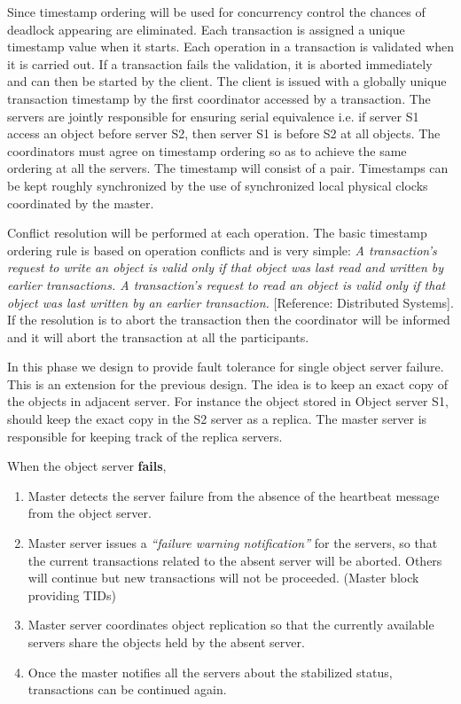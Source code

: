 \documentclass[times, 10pt,twocolumn]{article}
\begin{document}
\label{subsec:dldetect}
Since timestamp ordering will be used for concurrency control the chances of deadlock appearing are eliminated.
Each transaction is assigned a unique timestamp value when it starts. Each operation in a transaction is validated when it is carried out.
If a transaction fails the validation, it is aborted immediately and can then be started by the client. The client is issued with a globally unique transaction timestamp by the first coordinator accessed
by a transaction. The servers are jointly responsible for ensuring serial equivalence i.e. if server S1 access an object before server S2, then server S1 is before S2 at all objects. The coordinators
must agree on timestamp ordering so as to achieve the same ordering at all the servers. The timestamp will consist of a {\it <local timestamp, server-id> } pair. Timestamps can be kept roughly synchronized
by the use of synchronized local physical clocks coordinated by the master.

Conflict resolution will be performed at each operation.
The basic timestamp ordering rule is based on operation conflicts and is very simple:
{\it A transaction’s request to write an object is valid only if that object was last read and written by earlier transactions. A transaction’s request to read an object is valid only if that object was
last written by an earlier transaction.} [Reference: Distributed Systems].
If the resolution is to abort the transaction then the coordinator will be informed and it will abort the transaction at all the participants.

\label{subsec:faultol}
In this phase we design to provide fault tolerance for single object server failure. This is an extension for the previous design. The idea is to keep an exact copy of the objects in adjacent server.
For instance the object stored in Object server S1, should keep the exact copy in the S2 server as a replica. The master server is responsible for keeping track of the replica servers.

When the object server {\bf fails},
\begin{enumerate}
\item Master detects the server failure from the absence of the heartbeat message from the object server.
\item Master server issues a {\it “failure warning notification”} for the servers, so that the current transactions related to the absent server will be aborted.
Others will continue but new transactions will not be proceeded. (Master block providing TIDs)
\item Master server coordinates object replication so that the currently available servers share the objects held by the absent server.
\item Once the master notifies all the servers about the stabilized status, transactions can be continued again.
\end{enumerate}
\end{document}
